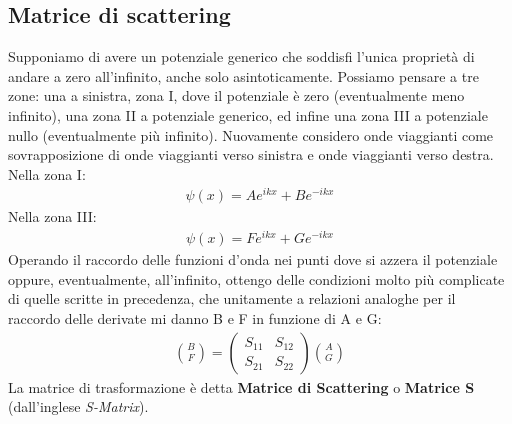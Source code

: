 \subsection{Matrice di scattering} %
Supponiamo di avere un potenziale generico che soddisfi l'unica proprietà di andare a zero all'infinito, anche solo asintoticamente.
Possiamo pensare a tre zone: una a sinistra, zona I, dove il potenziale è zero (eventualmente meno infinito), una zona II a potenziale generico, ed infine una zona III a potenziale nullo (eventualmente più infinito).
Nuovamente considero onde viaggianti come sovrapposizione di onde viaggianti verso sinistra e onde viaggianti verso destra.
Nella zona I:
\begin{equation}\begin{split}
\psi \left(x\right)=Ae^{ikx}+Be^{-ikx}
\end{split}\end{equation}
Nella zona III:
\begin{equation}\begin{split}
\psi \left(x\right)=Fe^{ikx}+Ge^{-ikx}
\end{split}\end{equation}
Operando il raccordo delle funzioni d'onda nei punti dove si azzera il potenziale oppure, eventualmente, all'infinito, ottengo delle condizioni molto più complicate di quelle scritte in precedenza, che unitamente a relazioni analoghe per il raccordo delle derivate mi danno B e F in funzione di A e G:
\begin{equation}\begin{split}
{B\choose F} =\left(\begin{matrix} {S_{11}} & {S_{12}}\\{S_{21}} & {S_{22}}\end{matrix}\right){{A}\choose{G}}
\end{split}\end{equation}
La matrice di trasformazione è detta \textbf{Matrice di Scattering} o \textbf{Matrice S} (dall'inglese \emph{S-Matrix}).

